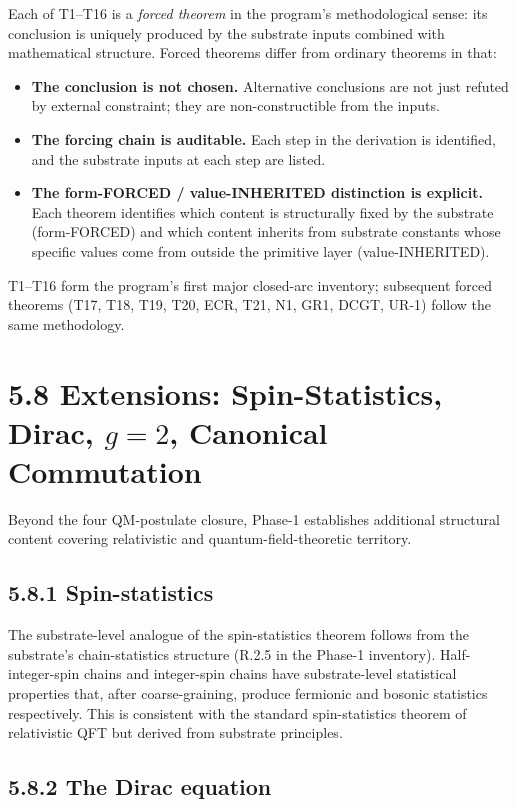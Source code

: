 \documentclass[11pt]{book}
\begin{document}
Each of T1–T16 is a \textit{forced theorem} in the program's methodological sense: its conclusion is uniquely produced by the substrate inputs combined with mathematical structure. Forced theorems differ from ordinary theorems in that:

\begin{itemize}
\item \textbf{The conclusion is not chosen.} Alternative conclusions are not just refuted by external constraint; they are non-constructible from the inputs.
\item \textbf{The forcing chain is auditable.} Each step in the derivation is identified, and the substrate inputs at each step are listed.
\item \textbf{The form-FORCED / value-INHERITED distinction is explicit.} Each theorem identifies which content is structurally fixed by the substrate (form-FORCED) and which content inherits from substrate constants whose specific values come from outside the primitive layer (value-INHERITED).
\end{itemize}

T1–T16 form the program's first major closed-arc inventory; subsequent forced theorems (T17, T18, T19, T20, ECR, T21, N1, GR1, DCGT, UR-1) follow the same methodology.

\section{5.8 Extensions: Spin-Statistics, Dirac, $g=2$, Canonical Commutation}

Beyond the four QM-postulate closure, Phase-1 establishes additional structural content covering relativistic and quantum-field-theoretic territory.

\subsection{5.8.1 Spin-statistics}

The substrate-level analogue of the spin-statistics theorem follows from the substrate's chain-statistics structure (R.2.5 in the Phase-1 inventory). Half-integer-spin chains and integer-spin chains have substrate-level statistical properties that, after coarse-graining, produce fermionic and bosonic statistics respectively. This is consistent with the standard spin-statistics theorem of relativistic QFT but derived from substrate principles.

\subsection{5.8.2 The Dirac equation}
\end{document}
